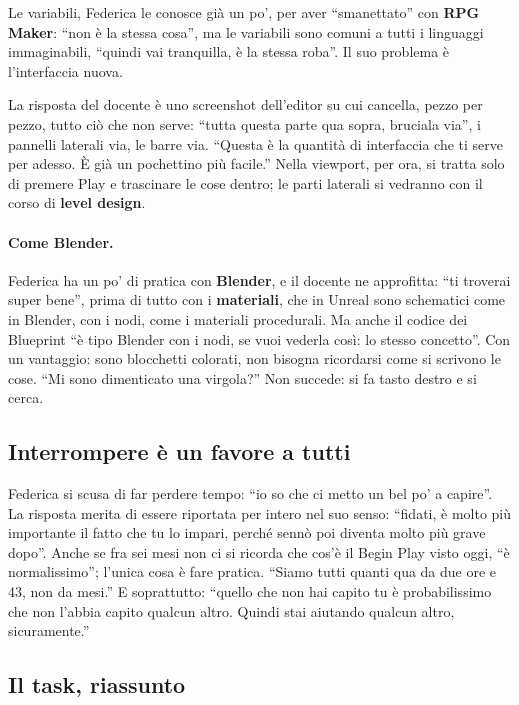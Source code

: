 Le variabili, Federica le conosce già un po', per aver ``smanettato'' con
\textbf{RPG Maker}: ``non è la stessa cosa'', ma le variabili sono comuni a
tutti i linguaggi immaginabili, ``quindi vai tranquilla, è la stessa roba''.
Il suo problema è l'interfaccia nuova.

La risposta del docente è uno screenshot dell'editor su cui cancella, pezzo
per pezzo, tutto ciò che non serve: ``tutta questa parte qua sopra, bruciala
via'', i pannelli laterali via, le barre via. ``Questa è la quantità di
interfaccia che ti serve per adesso. È già un pochettino più facile.'' Nella
viewport, per ora, si tratta solo di premere Play e trascinare le cose dentro;
le parti laterali si vedranno con il corso di \textbf{level design}.

\paragraph{Come Blender.} Federica ha un po' di pratica con
\textbf{Blender}, e il docente ne approfitta: ``ti troverai super bene'',
prima di tutto con i \textbf{materiali}, che in Unreal sono schematici come in
Blender, con i nodi, come i materiali procedurali. Ma anche il codice dei
Blueprint ``è tipo Blender con i nodi, se vuoi vederla così: lo stesso
concetto''. Con un vantaggio: sono blocchetti colorati, non bisogna ricordarsi
come si scrivono le cose. ``Mi sono dimenticato una virgola?'' Non succede: si
fa tasto destro e si cerca.

\subsection{Interrompere è un favore a tutti}

Federica si scusa di far perdere tempo: ``io so che ci metto un bel po' a
capire''. La risposta merita di essere riportata per intero nel suo senso:
``fidati, è molto più importante il fatto che tu lo impari, perché sennò poi
diventa molto più grave dopo''. Anche se fra sei mesi non ci si ricorda che
cos'è il Begin Play visto oggi, ``è normalissimo''; l'unica cosa è fare
pratica. ``Siamo tutti quanti qua da due ore e 43, non da mesi.'' E soprattutto:
``quello che non hai capito tu è probabilissimo che non l'abbia capito qualcun
altro. Quindi stai aiutando qualcun altro, sicuramente.''

\subsection{Il task, riassunto}

